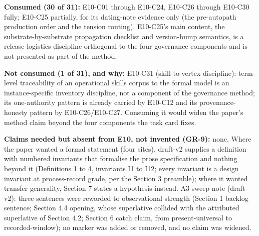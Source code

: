 \documentclass[
  11pt,
]{article}
\begin{document}
\textbf{Consumed (30 of 31):} E10-C01 through E10-C24, E10-C26 through
E10-C30 fully; E10-C25 partially, for its dating-note evidence only (the
pre-autopath production order and the tension routing). E10-C25's main
content, the substrate-by-substrate propagation checklist and
version-bump semantics, is a release-logistics discipline orthogonal to
the four governance components and is not presented as part of the
method.

\textbf{Not consumed (1 of 31), and why:} E10-C31 (skill-to-vertex
discipline): term-level traceability of an operational skills corpus to
the formal model is an instance-specific inventory discipline, not a
component of the governance method; its one-authority pattern is already
carried by E10-C12 and its provenance-honesty pattern by
E10-C26/E10-C27. Consuming it would widen the paper's method claim
beyond the four components the task card fixes.

\textbf{Claims needed but absent from E10, not invented (GR-9):} none.
Where the paper wanted a formal statement (four sites), draft-v2
supplies a definition with numbered invariants that formalise the prose
specification and nothing beyond it (Definitions 1 to 4, invariants I1
to I12; every invariant is a design invariant at process-record grade,
per the Section 3 preamble); where it wanted transfer generality,
Section 7 states a hypothesis instead. A3 sweep note (draft-v2): three
sentences were reworded to observational strength (Section 1 backlog
sentence; Section 4.4 opening, whose superlative collided with the
attributed superlative of Section 4.2; Section 6 catch claim, from
present-universal to recorded-window); no marker was added or removed,
and no claim was widened.
\end{document}
